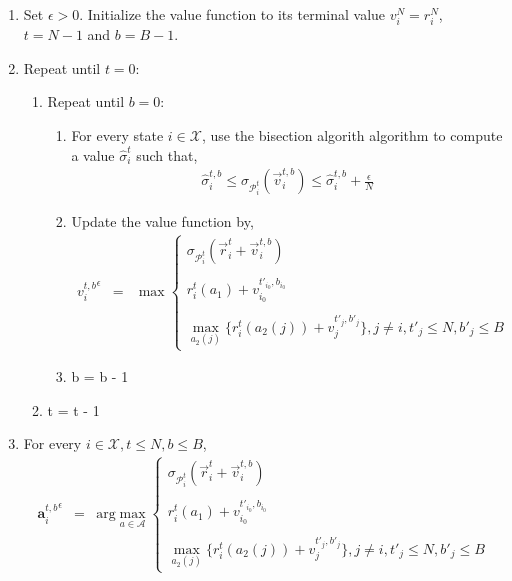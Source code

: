 \begin{enumerate}
	\item Set $\epsilon > 0$. Initialize the value function to its terminal value $v_i^N = r_i^N$, $t=N-1$ and $b=B-1$. \\
	\item Repeat until $t=0$: \\
		\begin{enumerate}
			\item Repeat until $b=0$: \\	
		\begin{enumerate}
			\item For every state $i \in \mathcal{X}$, use the bisection algorith algorithm to compute a value $\hat{\sigma}_i^t$ such that,
			\begin{eqnarray*}
				\hat{\sigma}_i^{t,b} \leq \sigma_{\mathcal{P}_i^t}(\vec{v}_i^{t,b}) \leq \hat{\sigma}_i^{t,b} + \frac{\epsilon}{N}
			\end{eqnarray*}
			\item Update the value function by,
			\begin{eqnarray*}
			{v_{i}^{t,b}}^\epsilon &=& \max
    			\begin{cases}
    			\sigma_{\mathcal{P}_{i}^{t}}(\vec{r}_{i}^{t} + \vec{v}_{i}^{t,b})\\ \\
    			r_{i}^{t}(a_1) + v_{i_0}^{t'_{i_0},b_{i_0}} \\ \\
    			\max_{a_2(j)} \bigg\{r_{i}^{t}(a_2(j)) + v_{j}^{t'_{j},b'_{j}}\bigg\}, j \neq i, t'_{j} \leq N, b'_{j} \leq B
    			\end{cases}
			\end{eqnarray*}
			\item b = b - 1 \\
		\end{enumerate}
		\item t = t - 1 \\
		\end{enumerate}
	\item For every $i \in \mathcal{X}, t \leq N, b \leq B$,
	\begin{eqnarray*}
	{\textbf{a}_{i}^{t,b}}^\epsilon &=& \textrm{arg}\max_{a \in \mathcal{A}}
    	\begin{cases}
    	\sigma_{\mathcal{P}_{i}^{t}}(\vec{r}_{i}^{t} + \vec{v}_{i}^{t,b})\\ \\
    	r_{i}^{t}(a_1) + v_{i_0}^{t'_{i_0},b_{i_0}} \\ \\
    	\max_{a_2(j)} \bigg\{r_{i}^{t}(a_2(j)) + v_{j}^{t'_{j},b'_{j}}\bigg\}, j \neq i, t'_{j} \leq N, b'_{j} \leq B
    	\end{cases}
	\end{eqnarray*}
\end{enumerate}




